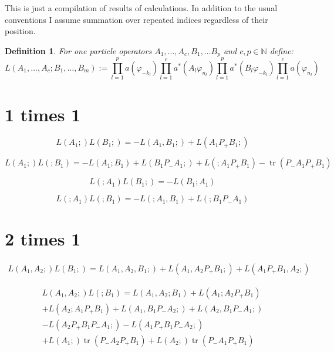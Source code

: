 \documentclass[b5paper,draft,openbib,12pt]{memoir}
\newtheorem{Def}{Definition}[section]
\DeclareMathOperator{\tr}{tr}
\begin{document}
\frontmatter
%
\mainmatter

This is just a compilation of results of calculations. In addition to the usual conventions I assume summation over
repeated indices regardless of their position. 

\begin{Def}
For one particle operators \(A_1,\dots, A_c,B_1,\dots B_p \) and \(c,p\in\mathbb{N}\) define:
\begin{equation*}
L(A_1,\dots, A_c; B_1,\dots ,B_m):= \prod_{l=1}^p a(\varphi_{-k_l}) 
\prod_{l=1}^c a^*(A_l \varphi_{n_l}) \prod_{l=1}^p a^*(B_l \varphi_{-k_l}) \prod_{l=1}^c a(\varphi_{n_l})
\end{equation*}
\end{Def}

\section{ 1 times 1}

\begin{equation}
L(A_1;)L(B_1;)=-L(A_1,B_1;) + L(A_1P_+B_1;)
\end{equation}

\begin{equation}
L(A_1;)L(;B_1)=-L(A_1;B_1) +L(B_1P_-A_1;) + L(;A_1P_+B_1) -\tr(P_-A_1P_+B_1)
\end{equation}

\begin{equation}
L(;A_1)L(B_1;)=-L(B_1;A_1)
\end{equation}

\begin{equation}
L(;A_1)L(;B_1)=-L(;A_1,B_1) + L(;B_1P_-A_1)
\end{equation}


\section{2 times 1}
\begin{multline}
L(A_1,A_2;)L(B_1;)=L(A_1,A_2,B_1;) + L(A_1,A_2P_+B_1;) + L(A_1P_+B_1,A_2;)
\end{multline}

\begin{multline}
L(A_1,A_2;)L(;B_1)= L(A_1,A_2;B_1) + L(A_1;A_2P_+B_1)\\
+L(A_2;A_1P_+B_1) + L(A_1,B_1P_-A_2;) + L(A_2,B_1P_-A_1;)\\
-L(A_2P_+B_1P_-A_1;) -L(A_1P_+B_1P_-A_2;) \\
+L(A_1;) \tr(P_-A_2P_+B_1) + L(A_2;) \tr(P_-A_1P_+B_1)
\end{multline}
\end{document}
